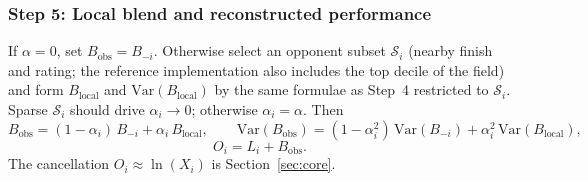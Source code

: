 \documentclass[12pt]{article}
\newcommand{\alphad}{\alpha}    %
\newcommand{\bobs}{B_{\mathrm{obs}}}
\newcommand{\blocal}{B_{\mathrm{local}}}
\begin{document}
	\subsubsection*{Step 5: Local blend and reconstructed performance}
	If $\alphad = 0$, set $\bobs = B_{-i}$. Otherwise select an opponent subset $\mathcal{S}_i$ (nearby finish and rating; the reference implementation also includes the top decile of the field) and form $B_{\mathrm{local}}$ and $\mathrm{Var}(B_{\mathrm{local}})$ by the same formulae as Step~4 restricted to $\mathcal{S}_i$. Sparse $\mathcal{S}_i$ should drive $\alpha_i \to 0$; otherwise $\alpha_i = \alphad$. Then
	\begin{equation}
		\bobs = (1 - \alpha_i)\, B_{-i} + \alpha_i\, \blocal, \qquad
		\mathrm{Var}(\bobs) = (1 - \alpha_i^2)\, \mathrm{Var}(B_{-i}) + \alpha_i^2\, \mathrm{Var}(\blocal),
	\end{equation}
	\begin{equation}
		O_i = L_i + \bobs.
	\end{equation}
	The cancellation $O_i \approx \ln(X_i)$ is Section~\ref{sec:core}.
\end{document}
